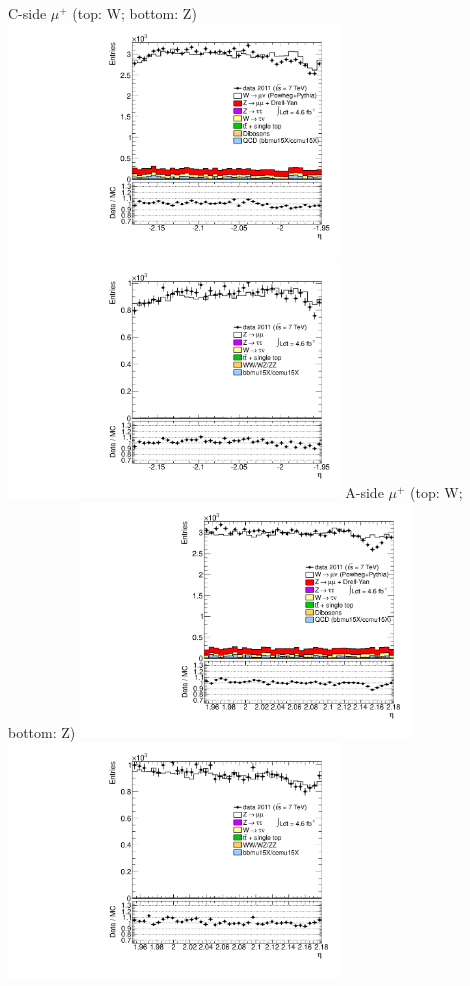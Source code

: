  {
\colb[T]
C-side $\mu^{+}$ (top: W; bottom: Z)
\centering
\includegraphics[width=0.66\textwidth]{dates/20130306/figures/etaphi/WpDtoH_10_C_stack_l_eta_POS} \\
\includegraphics[width=0.66\textwidth]{dates/20130306/figures/etaphi/Z_10_C_stack_lP_eta_ALL.pdf}
A-side $\mu^{+}$ (top: W; bottom: Z)
\centering
\includegraphics[width=0.66\textwidth]{dates/20130306/figures/etaphi/WpDtoH_10_A_stack_l_eta_POS} \\
\includegraphics[width=0.66\textwidth]{dates/20130306/figures/etaphi/Z_10_A_stack_lP_eta_ALL.pdf} 
\cole
}
